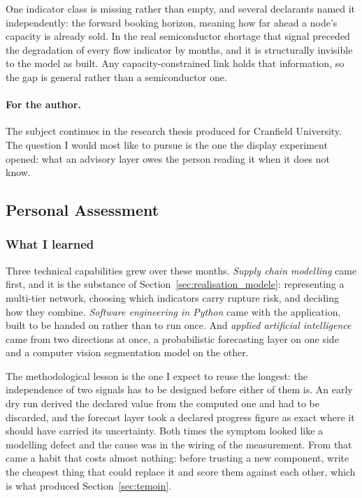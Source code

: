 One indicator class is missing rather than empty, and several declarants named it
independently: the forward booking horizon, meaning how far ahead a node's capacity is already
sold. In the real semiconductor shortage that signal preceded the degradation of every flow
indicator by months, and it is structurally invisible to the model as built. Any
capacity-constrained link holds that information, so the gap is general rather than a
semiconductor one.

\paragraph{For the author.}
The subject continues in the research thesis produced for Cranfield University. The question I
would most like to pursue is the one the display experiment opened: what an advisory layer owes
the person reading it when it does not know.

\subsection{Personal Assessment}
\label{sec:bilan}

\subsubsection{What I learned}

Three technical capabilities grew over these months. \emph{Supply chain modelling} came first,
and it is the substance of Section~\ref{sec:realisation_modele}: representing a multi-tier
network, choosing which indicators carry rupture risk, and deciding how they combine.
\emph{Software engineering in Python} came with the application, built to be handed on rather
than to run once. And \emph{applied artificial intelligence} came from two directions at once,
a probabilistic forecasting layer on one side and a computer vision segmentation model on the
other.

The methodological lesson is the one I expect to reuse the longest: the independence of two
signals has to be designed before either of them is. An early dry run derived the declared
value from the computed one and had to be discarded, and the forecast layer took a declared
progress figure as exact where it should have carried its uncertainty. Both times the symptom
looked like a modelling defect and the cause was in the wiring of the measurement. From that
came a habit that costs almost nothing: before trusting a new component, write the cheapest
thing that could replace it and score them against each other, which is what produced
Section~\ref{sec:temoin}.


